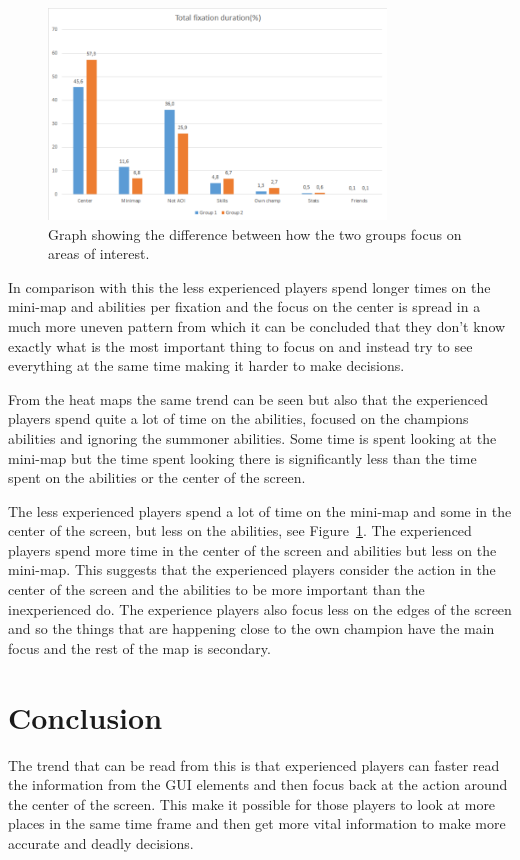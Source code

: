\documentclass[notitlepage]{report}
\begin{document}
\begin{figure}[h]
\centering
\includegraphics[width=0.8\textwidth]{images/AOIChart}
\caption{Graph showing the difference between how the two groups focus on areas of interest.}
\label{aoi}
\end{figure}

In comparison with this the less experienced players spend longer times on the mini-map and abilities per fixation and the focus on the center is spread in a much more uneven pattern from which it can be concluded that they don't know exactly what is the most important thing to focus on and instead try to see everything at the same time making it harder to make decisions.

From the heat maps the same trend can be seen but also that the experienced players spend quite a lot of time on the abilities, focused on the champions abilities and ignoring the summoner abilities. Some time is spent looking at the mini-map but the time spent looking there is significantly less than the time spent on the abilities or the center of the screen.

The less experienced players spend a lot of time on the mini-map and some in the center of the screen, but less on the abilities, see Figure~\ref{aoi}. The experienced players spend more time in the center of the screen and abilities but less on the mini-map. This suggests that the experienced players consider the action in the center of the screen and the abilities to be more important than the inexperienced do. The experience players also focus less on the edges of the screen and so the things that are happening close to the own champion have the main focus and the rest of the map is secondary.

\section{Conclusion}
The trend that can be read from this is that experienced players can faster read the information from the GUI elements and then focus back at the action around the center of the screen. This make it possible for those players to look at more places in the same time frame and then get more vital information to make more accurate and deadly decisions.
\end{document}
